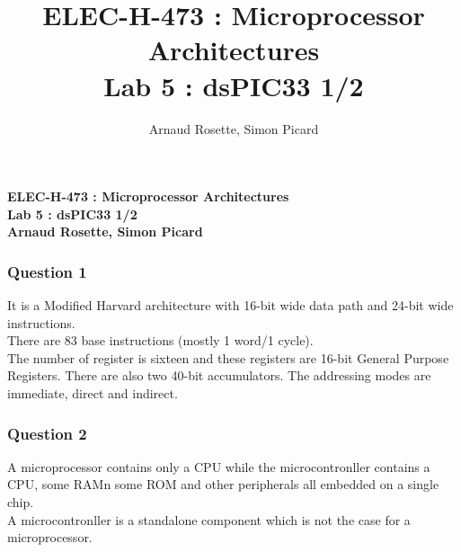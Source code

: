 \documentclass[a4paper,10pt]{article}
\title{ELEC-H-473 : Microprocessor Architectures\\ Lab 5 : dsPIC33 1/2}
\author{Arnaud Rosette, Simon Picard}
\begin{document}
\begin{center}
\textbf{ELEC-H-473 : Microprocessor Architectures\\ Lab 5 : dsPIC33 1/2\\Arnaud Rosette, Simon Picard}
\end{center}

\subsubsection*{Question 1}
It is a Modified Harvard architecture with 16-bit wide data path and 24-bit wide instructions.\\
There are 83 base instructions (mostly 1 word/1 cycle).\\
The number of register is sixteen and these registers are 16-bit General Purpose Registers. There are also two 40-bit accumulators. The addressing modes are immediate, direct and indirect.


\subsubsection*{Question 2}
A microprocessor contains only a CPU while the microcontronller contains a CPU, some RAMn some ROM and other peripherals all embedded on a single chip.\\
A microcontronller is a standalone component which is not the case for a microprocessor.
\end{document}
